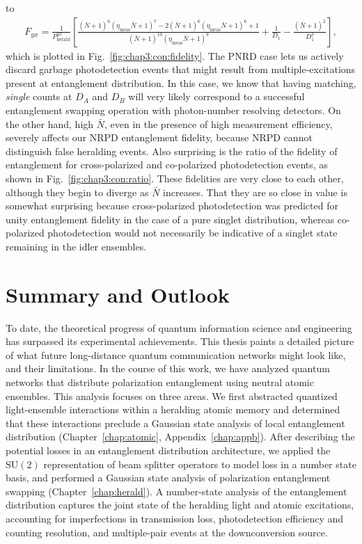 \documentclass[aps,twocolumn,secnumarabic,amsmath,amssymb,pra,groupedaddress,
showpacs, showkeys]{revtex4-1}
\newcommand{\pna}[1]{\left(#1\right)}
\newcommand{\pnb}[1]{\left[#1\right]}
\begin{document}
to
\begin{align}
    F_{yx}=\frac{1}{P_{\textrm{herald}}^{yx}}\pnb{\frac{(\bar{N}+1)^6 (\eta_{\textrm{meas}}  \bar{N}+1)^7-2 (\bar{N}+1)^6 (\eta_{\textrm{meas}}  \bar{N}+1)^6+1}{(\bar{N}+1)^{10} (\eta_{\textrm{meas}}  \bar{N}+1)^9} +\frac{1}{D_1}-\frac{\pna{\bar{N}+1}^2}{D_1^3}},
\end{align}
which is plotted in Fig.~\ref{fig:chap3:con:fidelity}. The PNRD case lets us
actively discard garbage photodetection events that might result from
multiple-excitations present at entanglement distribution. In this case, we
know that having matching, \emph{single} counts at $D_A$ and $D_B$ will very
likely correspond to a successful entanglement swapping operation with
photon-number resolving detectors. On the other hand, high $\bar{N}$, even in
the presence of high measurement efficiency, severely affects our NRPD
entanglement fidelity, because NRPD cannot distinguish false heralding
events. Also surprising is the ratio of the fidelity of entanglement for
cross-polarized and co-polarized photodetection events, as shown in
Fig.~\ref{fig:chap3:con:ratio}. These fidelities are very close to each other,
although they begin to diverge as $\bar{N}$ increases. That they are so close
in value is somewhat surprising because cross-polarized photodetection was
predicted for unity entanglement fidelity in the case of a pure singlet
distribution, whereas co-polarized photodetection would not necessarily be
indicative of a singlet state remaining in the idler ensembles.


\section{Summary and Outlook~\label{chap:conclusion}}

To date, the theoretical progress of quantum information science and
engineering has surpassed its experimental achievements. This thesis paints a
detailed picture of what future long-distance quantum communication networks
might look like, and their limitations. In the course of this work, we have
analyzed quantum networks that distribute polarization entanglement using
neutral atomic ensembles. This analysis focuses on three areas. We first
abstracted quantized light-ensemble interactions within a heralding atomic
memory and determined that these interactions preclude a Gaussian state
analysis of local entanglement distribution (Chapter~\ref{chap:atomic},
Appendix~\ref{chap:appb}). After describing the potential losses in an
entanglement distribution architecture, we applied the $\textrm{SU}\pna{2}$
representation of beam splitter operators to model loss in a number state
basis, and performed a Gaussian state analysis of polarization entanglement
swapping (Chapter~\ref{chap:herald}). A number-state analysis of the
entanglement distribution captures the joint state of the heralding light and
atomic excitations, accounting for imperfections in transmission loss,
photodetection efficiency and counting resolution, and multiple-pair events at
the downconversion source.
\end{document}

